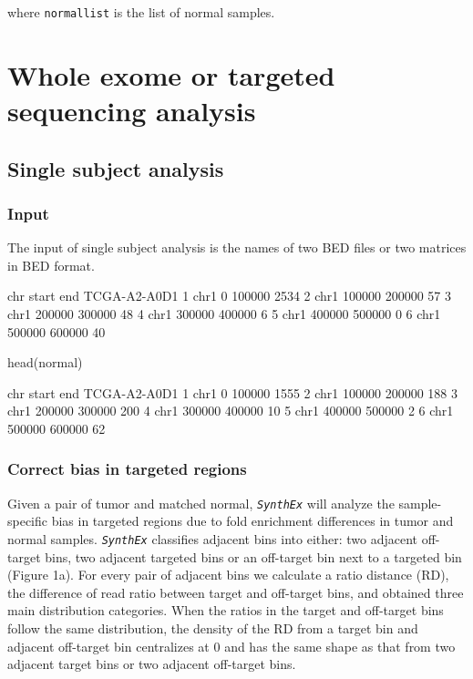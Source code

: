 \documentclass{article}
\newcommand{\pkg}[1]{\texttt{\textsl{#1}}}
\newcommand{\code}[1]{\texttt{#1}}
\begin{document}
where \code{normallist} is the list of normal samples.

\section{Whole exome or targeted sequencing analysis}

\subsection{Single subject analysis}

\subsubsection{Input}
The input of single subject analysis is the names of two BED files or two matrices in BED format.
\begin{Schunk}
\begin{Soutput}
   chr  start    end TCGA-A2-A0D1
1 chr1      0 100000         2534
2 chr1 100000 200000           57
3 chr1 200000 300000           48
4 chr1 300000 400000            6
5 chr1 400000 500000            0
6 chr1 500000 600000           40
\end{Soutput}
\begin{Sinput}
 head(normal)
\end{Sinput}
\begin{Soutput}
   chr  start    end TCGA-A2-A0D1
1 chr1      0 100000         1555
2 chr1 100000 200000          188
3 chr1 200000 300000          200
4 chr1 300000 400000           10
5 chr1 400000 500000            2
6 chr1 500000 600000           62
\end{Soutput}
\end{Schunk}

\subsubsection{Correct bias in targeted regions}
Given a pair of tumor and matched normal, \pkg{SynthEx} will analyze the sample-specific bias in targeted regions due to fold enrichment differences in tumor and normal samples. \pkg{SynthEx} classifies adjacent bins into either: two adjacent off-target bins, two adjacent targeted bins or an off-target bin next to a targeted bin (Figure 1a). For every pair of adjacent bins we calculate a ratio distance (RD), the difference of read ratio between target and off-target bins, and obtained three main distribution categories. When the ratios in the target and off-target bins follow the same distribution, the density of the RD from a target bin and adjacent off-target bin centralizes at 0 and has the same shape as that from two adjacent target bins or two adjacent off-target bins.
\end{document}
